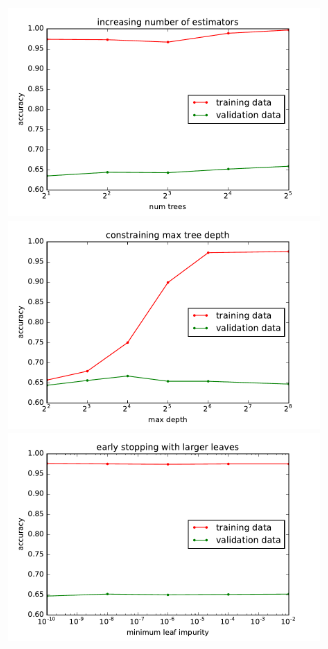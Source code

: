 \documentclass{article}
\newcommand\halfwidth{3.25in}
\begin{document}
\begin{multicols}{2}
\begin{figure}[t]
   \centering
   \includegraphics[width=\halfwidth]{img/rf-numEstimators.pdf}\hspace{-.1in}
   \includegraphics[width=\halfwidth]{img/rf-maxTreeDepth.pdf}
   \includegraphics[width=\halfwidth]{img/rf-impurity.pdf}\hspace{-.1in}

\end{figure}
\end{multicols}
\end{document}
